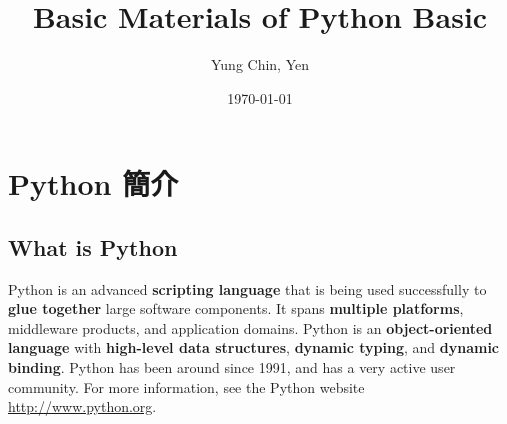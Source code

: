 \documentclass[a4paper,12pt]{article}
\author{Yung Chin, Yen}
\date{\today}
\title{Basic Materials of Python Basic}
\begin{document}
\maketitle
\tableofcontents


\section{Python 簡介}
\label{py-introduction}
\subsection{What is Python}
\label{sec:org8928078}
Python is an advanced \textbf{scripting language} that is being used successfully to \textbf{glue together} large software components. It spans \textbf{multiple platforms}, middleware products, and application domains. Python is an \textbf{object-oriented language} with \textbf{high-level data structures}, \textbf{dynamic typing}, and \textbf{dynamic binding}. Python has been around since 1991, and has a very active user community. For more information, see the Python website \url{http://www.python.org}.\\
\end{document}
